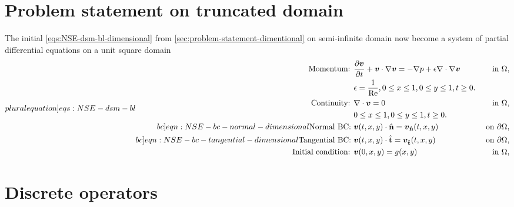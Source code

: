 \documentclass{article}
\numberwithin{equation}{section}
\begin{document}



\section{Problem statement on truncated domain}\label{sec:problem-statement-nondimensional}
The initial \cref{eqs:NSE-dsm-bl-dimensional} from \cref{sec:problem-statement-dimentional} on semi-infinite domain now become a system of partial differential equations on a unit square domain 
\begin{subequations}
\label[pluralequation]{eqs:NSE-dsm-bl}
\begin{align}
\label{eqn:momentum}
\text{Momentum: }	&\frac{\partial \boldsymbol{v}}{\partial t} + \boldsymbol{v} \cdot \nabla \boldsymbol{v} = -\nabla p + \epsilon \nabla \cdot \nabla \boldsymbol{v} \quad&\text{ in }\Omega, \\ 
					&\epsilon = \frac{1}{\operatorname{Re}},0\leq x \leq 1, 0\leq y \leq 1, t\geq0.\notag\\
\label{eqn:continuity-dsm-bl}
\text{Continuity: }	& \nabla \cdot \boldsymbol{v} = 0 \quad&\text{ in }\Omega, \\ 
					&0\leq x \leq 1, 0\leq y \leq 1, t\geq0. \notag\\
\label[bc]{eqn:NSE-bc-normal-dimensional}
\text{Normal BC: } & \boldsymbol{v}(t,x,y)\cdot\hat{\mathbf{n}}=\boldsymbol{v}_\mathbf{\hat{n}}(t,x,y) \quad&\text{ on }\partial\Omega, \\
\label[bc]{eqn:NSE-bc-tangential-dimensional}
\text{Tangential BC: } & \boldsymbol{v}(t,x,y)\cdot\hat{\mathbf{t}}=\boldsymbol{v}_\mathbf{\hat{t}}(t,x,y) \quad&\text{ on }\partial\Omega, \\
\label{eqn:NSE-ic-dimensional}
\text{Initial condition: } &\boldsymbol{v}(0,x,y)=g(x,y) \quad&\text{ in }\Omega,
\end{align}
\end{subequations}


	


\pagebreak
\section{Discrete operators}\label{sec:discrete-operators}
\end{document}
